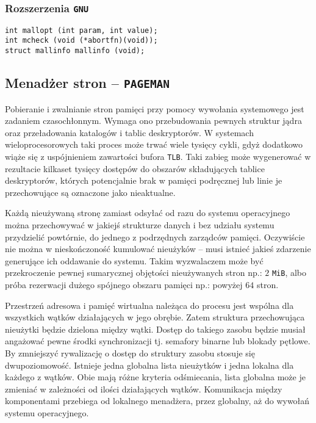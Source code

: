 \documentclass[12pt,a4paper,titlepage,twoside]{mwart}
\begin{document}
\subsubsection{Rozszerzenia \texttt{GNU}}

\vspace{2ex}
\begin{lstlisting}[caption={Prototypy pozostałych procedur i zmiennych.}]
int mallopt (int param, int value);
int mcheck (void (*abortfn)(void));
struct mallinfo mallinfo (void);
\end{lstlisting}

\newpage

\subsection{Menadżer stron -- \texttt{PAGEMAN}}

Pobieranie i zwalnianie stron pamięci przy pomocy wywołania systemowego jest
zadaniem czasochłonnym. Wymaga ono przebudowania pewnych struktur jądra oraz
przeładowania katalogów i tablic deskryptorów. W systemach wieloprocesorowych
taki proces może trwać wiele tysięcy cykli, gdyż dodatkowo wiąże się z
uspójnieniem zawartości bufora \texttt{TLB}. Taki zabieg może wygenerować w
rezultacie kilkaset tysięcy dostępów do obszarów składujących tablice
deskryptorów, których potencjalnie brak w pamięci podręcznej lub linie je
przechowujące są oznaczone jako nieaktualne.

Każdą nieużywaną stronę zamiast odsyłać od razu do systemu operacyjnego można
przechowywać w jakiejś strukturze danych i bez udziału systemu przydzielić
powtórnie, do jednego z podrzędnych zarządców pamięci. Oczywiście nie można w
nieskończoność kumulować nieużyków -- musi istnieć jakieś zdarzenie generujące
ich oddawanie do systemu. Takim wyzwalaczem może być przekroczenie pewnej
sumarycznej objętości nieużywanych stron np.: $2$ \verb+MiB+, albo próba
rezerwacji dużego spójnego obszaru pamięci np.: powyżej $64$ stron.

Przestrzeń adresowa i pamięć wirtualna należąca do procesu jest wspólna dla
wszystkich wątków działających w jego obrębie. Zatem struktura przechowująca
nieużytki będzie dzielona między wątki. Dostęp do takiego zasobu będzie musiał
angażować pewne środki synchronizacji tj. semafory binarne lub blokady pętlowe.
By zmniejszyć rywalizację o dostęp do struktury zasobu stosuje się
dwupoziomowość. Istnieje jedna globalna lista nieużytków i jedna lokalna dla
każdego z wątków. Obie mają różne kryteria odśmiecania, lista globalna może je
zmieniać w zależności od ilości działających wątków. Komunikacja między
komponentami przebiega od lokalnego menadżera, przez globalny, aż do wywołań
systemu operacyjnego.
\end{document}
